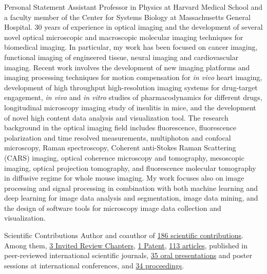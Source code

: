 \documentclass{resume}
\begin{document}
\begin{category}{Personal Statement}
\citemnobullet 
 Assistant Professor in Physics at Harvard Medical School and a faculty member of the Center for Systems Biology at Massachusetts General Hospital. 30 years of experience in optical imaging and the development of several novel optical microscopic and macroscopic molecular imaging techniques for biomedical imaging. In particular, my work has been focused on cancer imaging, functional imaging of engineered tissue, neural imaging and cardiovascular imaging. Recent work involves the development of new imaging platforms and imaging processing techniques for motion compensation for {\it in vivo} heart imaging, development of high throughput high-resolution imaging systems for drug-target engagement, {\it in vivo} and {\it in vitro} studies of pharmacodynamics for different drugs, longitudinal microscopy imaging study of insulitis in mice, and the development of novel high content data analysis and visualization tool. The research background in the optical imaging field includes fluorescence, fluorescence polarization and time resolved measurements, multiphoton and confocal microscopy, Raman spectroscopy, Coherent anti-Stokes Raman Scattering (CARS) imaging, optical coherence microscopy and tomography, mesoscopic imaging, optical projection tomography, and fluorescence molecular tomography in diffusive regime for whole mouse imaging.  
My work focuses also on image processing and signal processing in combination with both machine learning and deep learning for image data analysis and segmentation, image data mining, and the design of software tools for microscopy image data collection and visualization. 


\end{category}
%
%
\begin{category}{Scientific Contributions}
\citemnobullet 
Author and coauthor of \href{https://cvinegoni.github.io/diffpubs}{186 scientific contributions}.
Among them, \href{https://cvinegoni.github.io/books/}{3 Invited Review
Chapters}, \href{https://cvinegoni.github.io/patents/}{1 Patent},  \href{https://cvinegoni.github.io/papers/}{113
articles},
 published in peer-reviewed international scientific
journals, \href{https://cvinegoni.github.io/proceedings/\#conferences}{35 oral
presentations}
and poster sessions at international conferences, and
\href{https://cvinegoni.github.io/proceedings/\#proceedings-papers}{34
proceedings}.
\end{category}
\end{document}
